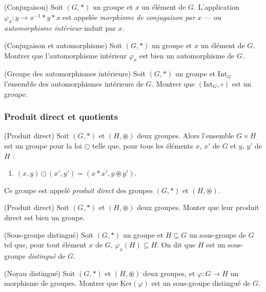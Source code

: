 \begin{defn}(Conjugaison)
Soit $(G, \ast)$ un groupe et $x$ un élément de $G$.
L'application $\varphi_x : y \to x^{-1} \ast y \ast x$
est appelée \emph{morphisme de conjugaison par} $x$
--- ou \emph{automorphisme intérieur} induit par $x$.
\end{defn}

\begin{exo}(Conjugaison et automorphisme)
Soit $(G, \ast)$ un groupe et $x$ un élément de $G$.
Montrer que l'automorphisme intérieur $\varphi_x$
est bien un automorphisme de $G$.
\end{exo}

\begin{exo}(Groupe des automorphismes intérieurs)
Soit $(G, \ast)$ un groupe et $\mathrm{Int}_G$ l'ensemble des
automorphismes intérieurs de $G$.
Montrer que $(\mathrm{Int}_G, \circ)$ est un groupe.
\end{exo}

\subsubsection{Produit direct et quotients}

\begin{defn}(Produit direct)
Soit $(G, \ast)$ et $(H, \circledast)$ deux groupes.
Alors l'ensemble $G \times H$ est un groupe pour la loi
$\odot$ telle que,
pour tous les éléments $x$, $x'$ de $G$ et
$y$, $y'$ de $H$ :
\begin{enumerate}
\item $(x, y) \odot (x', y') = (x \ast x', y \circledast y')$.
\end{enumerate}
Ce groupe est appelé
\emph{produit direct} des groupes $(G, \ast)$ et $(H, \circledast)$.
\end{defn}

\begin{exo}(Produit direct)
Soit $(G, \ast)$ et $(H, \circledast)$ deux groupes.
Monter que leur produit direct est bien un groupe.
\end{exo}

\begin{defn}(Sous-groupe distingué)
Soit $(G, \ast)$ un groupe et $H \subseteq G$ un sous-groupe de $G$ tel que,
pour tout élément $x$ de $G$, $\varphi_x(H) \subseteq H$.
On dit que $H$ est un sous-groupe \emph{distingué} de $G$.
\end{defn}

\begin{exo}(Noyau distingué)
Soit $(G, \ast)$ et $(H, \circledast)$ deux groupes,
et $\varphi : G \to H$ un morphisme de groupes.
Montrer que $\mathrm{Ker}(\varphi)$ est un sous-groupe distingué de $G$.
\end{exo}

